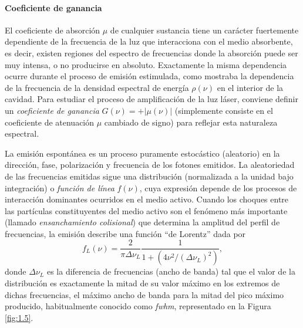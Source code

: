 \paragraph{Coeficiente de ganancia}
El coeficiente de absorción $\mu$ de cualquier sustancia tiene un carácter fuertemente dependiente de la frecuencia de la luz que interacciona con el medio absorbente, es decir, existen regiones del espectro de frecuencias donde la absorción puede ser muy intensa, o no producirse en absoluto. Exactamente la misma dependencia ocurre durante el proceso de emisión estimulada, como mostraba la dependencia de la frecuencia de la densidad espectral de energía $\rho(\nu)$ en el interior de la cavidad. Para estudiar el proceso de amplificación de la luz láser, conviene definir un \emph{coeficiente de ganancia} $G(\nu) = +|\mu(\nu)|$ (simplemente consiste en el coeficiente de atenuación $\mu$ cambiado de signo) para reflejar esta naturaleza espectral.

La emisión espontánea es un proceso puramente estocástico (aleatorio) en la dirección, fase, polarización y frecuencia de los fotones emitidos. La aleatoriedad de las frecuencias emitidas sigue una distribución (normalizada a la unidad bajo integración) o \emph{función de línea} $f(\nu)$, cuya expresión depende de los procesos de interacción dominantes ocurridos en el medio activo. Cuando los choques entre las partículas constituyentes del medio activo son el fenómeno más importante (llamado \emph{ensanchamiento colisional}) que determina la amplitud del perfil de frecuencias, la emisión describe una función \enquote{de Lorentz} dada por \autocite{Milonni1988,Tallents2003,Svelto2010}
\begin{equation}\label{eq:1.12}
  f_{L}(\nu) = \frac{2}{\pi \Delta \nu_{L}}\frac{1}{1 + \left(4 \nu^{2}/(\Delta \nu_{L})^{2}\right)},
\end{equation}
donde $\Delta \nu_{L}$ es la diferencia de frecuencias (ancho de banda) tal que el valor de la distribución es exactamente la mitad de su valor máximo en los extremos de dichas frecuencias, el máximo ancho de banda para la mitad del pico máximo producido, habitualmente conocido como \emph{\acrfull{fwhm}}, representado en la Figura \ref{fig:1.5}. 

